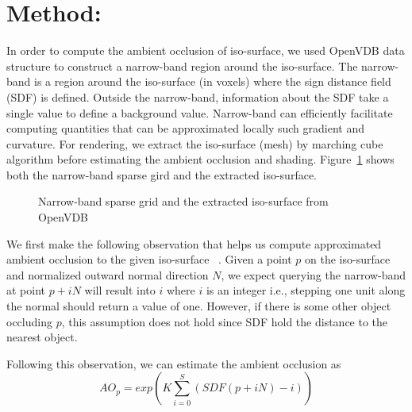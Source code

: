 \documentclass[a4paper,10pt]{article}
\begin{document}
\section{Method:}
In order to compute the ambient occlusion of iso-surface, we used OpenVDB data structure to construct a narrow-band region around the iso-surface. The narrow-band is a region around the iso-surface (in voxels) where the sign distance field (SDF) is defined. Outside the narrow-band, information about the SDF take a single value to define a background value. Narrow-band can efficiently facilitate computing quantities that can be approximated locally such gradient and curvature. For rendering, we extract the iso-surface (mesh) by marching cube algorithm before estimating the ambient occlusion and shading. Figure~\ref{fig:narrow} shows both the narrow-band sparse gird and the extracted iso-surface. 


\begin{figure}[!tbh]
\centering        
   \caption{Narrow-band sparse grid and the extracted iso-surface from OpenVDB}
   \label{fig:narrow}
\end{figure}




We first make the following observation that helps us compute approximated ambient occlusion to the given iso-surface ~\citep{Evans:2006:FAG:1185657.1185834}. Given a point $p$ on the iso-surface and normalized outward normal direction $N$, we expect querying the narrow-band at point $p+iN$ will result into $i$ where $i$ is an integer i.e., stepping one unit along the normal should return a value of one. However, if there is some other object occluding $p$, this assumption does not hold since SDF hold the distance to the nearest object. 


Following this observation, we can estimate the ambient occlusion as 
$$
AO_{p} = exp(K \sum_{i=0}^{S}( SDF(p+iN) - i))
$$
\end{document}
